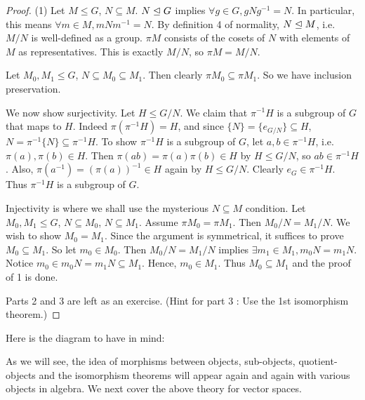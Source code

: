 \documentclass[../../book.tex]{subfiles}
\begin{document}
\begin{proof}
    
    (1) Let $M \leq G$, $N \subseteq M$. 
    $N \trianglelefteq G$ implies $\forall g \in G, gNg^{-1} = N$. 
    In particular, this means $\forall m \in M, mNm^{-1} = N$. 
    By definition 4 of normality, $N \trianglelefteq M$, 
    i.e. $M/N$ is well-defined as a group. 
    $\pi M$ consists of the cosets of $N$ with elements of $M$ as representatives. 
    This is exactly $M/N$, so $\pi M = M/N$. 
    
    Let $M_0, M_1 \leq G$, $N \subseteq M_0 \subseteq M_1$.
    Then clearly $\pi M_0 \subseteq \pi M_1$. 
    So we have inclusion preservation. 
    
    We now show surjectivity. Let $H \leq G/N$. 
    We claim that $\pi^{-1} H$ is a subgroup of $G$ that maps to $H$. 
    Indeed $\pi(\pi^{-1} H) = H$, 
    and since $\{N\} = \{e_{G/N}\} \subseteq H$, 
    $N = \pi^{-1} \{N\} \subseteq \pi^{-1} H$.
    To show $\pi^{-1} H$ is a subgroup of $G$, 
    let $a, b \in \pi^{-1} H$, i.e. $\pi(a), \pi(b) \in H$. 
    Then $\pi(ab) = \pi(a)\pi(b) \in H$ by $H \leq G/N$, so $ab \in \pi^{-1} H$. 
    Also, $\pi(a^{-1}) = (\pi(a))^{-1} \in H$ again by $H \leq G/N$. 
    Clearly $e_G \in \pi^{-1} H$. Thus $\pi^{-1} H$ is a subgroup of $G$. 
    
    Injectivity is where we shall use the mysterious $N \subseteq M$ condition. 
    Let $M_0, M_1 \leq G$, $N \subseteq M_0$, $N \subseteq M_1$. 
    Assume $\pi M_0 = \pi M_1$. Then $M_0 / N = M_1 / N$. 
    We wish to show $M_0 = M_1$. 
    Since the argument is symmetrical, it suffices to prove $M_0 \subseteq M_1$. 
    So let $m_0 \in M_0$. Then $M_0 / N = M_1 / N$ implies
    $\exists m_1 \in M_1, m_0 N = m_1 N$. 
    Notice $m_0 \in m_0 N = m_1 N \subseteq M_1$.  
    Hence, $m_0 \in M_1$. Thus $M_0 \subseteq M_1$
    and the proof of 1 is done. 

    Parts 2 and 3 are left as an exercise. 
    (Hint for part 3 : Use the 1st isomorphism theorem.)
\end{proof}

Here is the diagram to have in mind:
\begin{figure}[ht]
    \centering
\end{figure}
\begin{rmk}
    As we will see, 
    the idea of morphisms between objects, 
    sub-objects, quotient-objects and the isomorphism theorems
    will appear again and again with various objects in algebra. 
    We next cover the above theory for vector spaces. 
\end{rmk}
\end{document}
